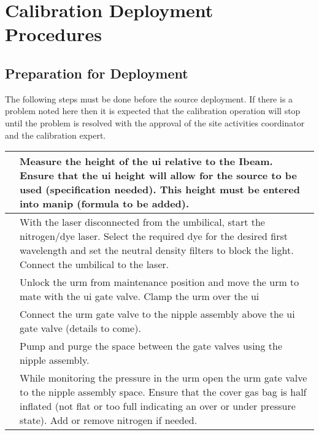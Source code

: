 \section{Calibration Deployment Procedures}

\subsection{Preparation for Deployment}
The following steps must be done before the source deployment. If there is a problem noted here then it is expected that the calibration operation will stop until the problem is resolved with the approval of the site activities coordinator and the calibration expert. 
\begin{tabular}{|c|p{4cm}|}
& Measure the height of the ui relative to the Ibeam. Ensure that the ui height will allow for the source to be used (specification needed). This height must be entered into manip (formula to be added). \\ \hline
& With the laser disconnected from the umbilical, start the nitrogen/dye laser. Select the required dye for the desired first wavelength and set the neutral density filters to block the light. Connect the umbilical to the laser. \\ \hline
& Unlock the urm from maintenance position and move the urm to mate with the ui gate valve. Clamp the urm over the ui \\ \hline
& Connect the urm gate valve to the nipple assembly above the ui gate valve (details to come). \\ \hline
& Pump and purge the space between the gate valves using the nipple assembly. \\ \hline
& While monitoring the pressure in the urm open the urm gate valve to the nipple assembly space. Ensure that the cover gas bag is half inflated (not flat or too full indicating an over or under pressure state). Add or remove nitrogen if needed. \\ \hline
\end{tabular}

